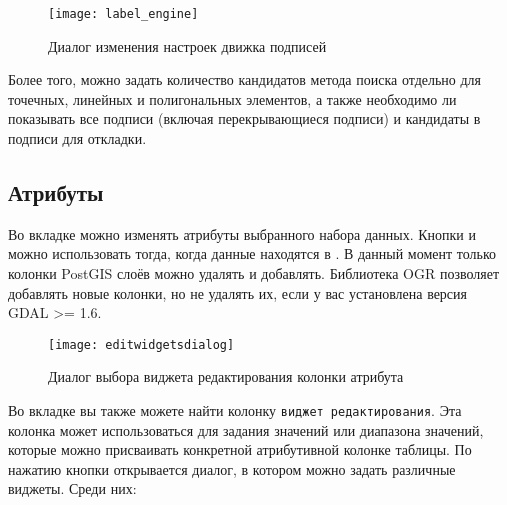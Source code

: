 \begin{figure}[ht]
\centering
   \texttt{[image: label\_engine]}
   \caption{Диалог изменения настроек движка подписей \wincaption}\label{fig:labelengine}
\end{figure}

Более того, можно задать количество кандидатов метода поиска отдельно для
точечных, линейных и полигональных элементов, а также необходимо ли показывать
все подписи (включая перекрывающиеся подписи) и кандидаты в подписи для
откладки.

\subsection{Атрибуты}\label{label_attributes}

Во вкладке  можно изменять атрибуты выбранного набора данных.
Кнопки  и
 можно
использовать тогда, когда данные находятся в .
В данный момент только колонки PostGIS слоёв можно удалять и добавлять.
Библиотека OGR позволяет добавлять новые колонки, но не удалять их, если
у вас установлена версия GDAL >= 1.6.


\begin{figure}[ht]
   \centering
   \texttt{[image: editwidgetsdialog]}
   \caption{Диалог выбора виджета редактирования колонки атрибута
\wincaption}\label{fig:editwidget}
\end{figure}

Во вкладке  вы также можете найти колонку \texttt{виджет редактирования}.
Эта колонка может использоваться для задания значений или диапазона значений,
которые можно присваивать конкретной атрибутивной колонке таблицы. По
нажатию кнопки  открывается диалог, в котором
можно задать различные виджеты. Среди них:

